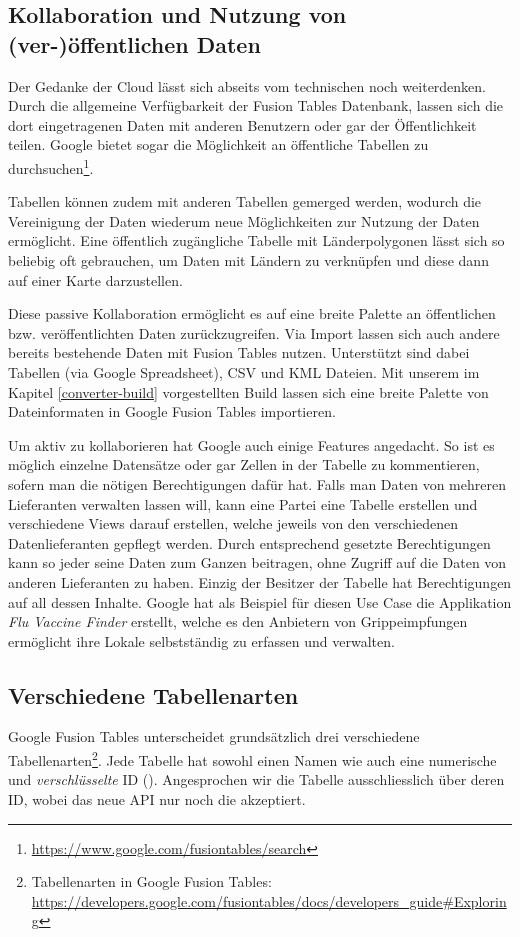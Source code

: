 \subsection{Kollaboration und Nutzung von (ver-)öffentlichen Daten}
Der Gedanke der \gls{Cloud} lässt sich abseits vom technischen noch weiterdenken. Durch die allgemeine Verfügbarkeit der Fusion Tables Datenbank, lassen sich die dort eingetragenen Daten mit anderen Benutzern oder gar der Öffentlichkeit teilen. Google bietet sogar die Möglichkeit an öffentliche Tabellen zu durchsuchen\footnote{\url{https://www.google.com/fusiontables/search}}.

Tabellen können zudem mit anderen Tabellen gemerged werden, wodurch die Vereinigung der Daten wiederum neue Möglichkeiten zur Nutzung der Daten ermöglicht. Eine öffentlich zugängliche Tabelle mit Länderpolygonen lässt sich so beliebig oft gebrauchen, um Daten mit Ländern zu verknüpfen und diese dann auf einer Karte darzustellen.

Diese passive Kollaboration ermöglicht es auf eine breite Palette an öffentlichen bzw. veröffentlichten Daten zurückzugreifen. Via Import lassen sich auch andere bereits bestehende Daten mit Fusion Tables nutzen. Unterstützt sind dabei Tabellen (via Google Spreadsheet), \gls{CSV} und \gls{KML} Dateien. Mit unserem im Kapitel \ref{converter-build} vorgestellten Build lassen sich eine breite Palette von Dateinformaten in Google Fusion Tables importieren.

Um aktiv zu kollaborieren hat Google auch einige Features angedacht. So ist es möglich einzelne Datensätze oder gar Zellen in der Tabelle zu kommentieren, sofern man die nötigen Berechtigungen dafür hat. Falls man Daten von mehreren Lieferanten verwalten lassen will, kann eine Partei eine Tabelle erstellen und verschiedene Views darauf erstellen, welche jeweils von den verschiedenen Datenlieferanten gepflegt werden. Durch entsprechend gesetzte Berechtigungen kann so jeder seine Daten zum Ganzen beitragen, ohne Zugriff auf die Daten von anderen Lieferanten zu haben. Einzig der Besitzer der Tabelle hat Berechtigungen auf all dessen Inhalte. Google hat als Beispiel für diesen Use Case die Applikation \emph{Flu Vaccine Finder} erstellt, welche es den Anbietern von Grippeimpfungen ermöglicht ihre Lokale selbstständig zu erfassen und verwalten.\cite{data-gathering}

\subsection{Verschiedene Tabellenarten}
Google Fusion Tables unterscheidet grundsätzlich drei verschiedene Tabellenarten\footnote{Tabellenarten in Google Fusion Tables: \url{https://developers.google.com/fusiontables/docs/developers_guide\#Exploring}}. Jede Tabelle hat sowohl einen Namen wie auch eine numerische und \emph{verschlüsselte} ID (). Angesprochen wir die Tabelle ausschliesslich über deren ID, wobei das neue API nur noch die  akzeptiert.

